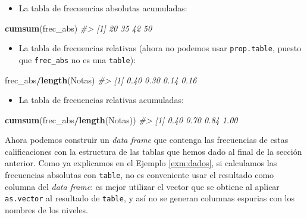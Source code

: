 \documentclass[
]{book}
\newenvironment{Shaded}{\begin{snugshade}}{\end{snugshade}}
\newcommand{\CommentTok}[1]{\textcolor[rgb]{0.56,0.35,0.01}{\textit{#1}}}
\newcommand{\KeywordTok}[1]{\textcolor[rgb]{0.13,0.29,0.53}{\textbf{#1}}}
\newcommand{\NormalTok}[1]{#1}
\newcommand{\OperatorTok}[1]{\textcolor[rgb]{0.81,0.36,0.00}{\textbf{#1}}}
\providecommand{\tightlist}{%
  \setlength{\itemsep}{0pt}\setlength{\parskip}{0pt}}
\theoremstyle{definition}
\theoremstyle{definition}
\theoremstyle{definition}
\theoremstyle{remark}
\begin{document}
\begin{itemize}
\tightlist
\item
  La tabla de frecuencias absolutas acumuladas:
\end{itemize}

\begin{Shaded}
\begin{Highlighting}[]
\KeywordTok{cumsum}\NormalTok{(frec\_abs) }
\CommentTok{\#\textgreater{} [1] 20 35 42 50}
\end{Highlighting}
\end{Shaded}

\begin{itemize}
\tightlist
\item
  La tabla de frecuencias relativas (ahora no podemos usar \texttt{prop.table}, puesto que \texttt{frec\_abs} no es una \texttt{table}):
\end{itemize}

\begin{Shaded}
\begin{Highlighting}[]
\NormalTok{frec\_abs}\OperatorTok{/}\KeywordTok{length}\NormalTok{(Notas)  }
\CommentTok{\#\textgreater{} [1] 0.40 0.30 0.14 0.16}
\end{Highlighting}
\end{Shaded}

\begin{itemize}
\tightlist
\item
  La tabla de frecuencias relativas acumuladas:
\end{itemize}

\begin{Shaded}
\begin{Highlighting}[]
\KeywordTok{cumsum}\NormalTok{(frec\_abs}\OperatorTok{/}\KeywordTok{length}\NormalTok{(Notas))  }
\CommentTok{\#\textgreater{} [1] 0.40 0.70 0.84 1.00}
\end{Highlighting}
\end{Shaded}

Ahora podemos construir un \emph{data frame} que contenga las frecuencias de estas calificaciones con la estructura de las tablas que hemos dado al final de la sección anterior. Como ya explicamos en el Ejemplo \ref{exm:dados}, si calculamos las frecuencias absolutas con \texttt{table}, no es conveniente usar el resultado como columna del \emph{data frame}: es mejor utilizar el vector que se obtiene al aplicar \texttt{as.vector} al resultado de \texttt{table}, y así no se generan columnas espurias con los nombres de los niveles.
\end{document}
